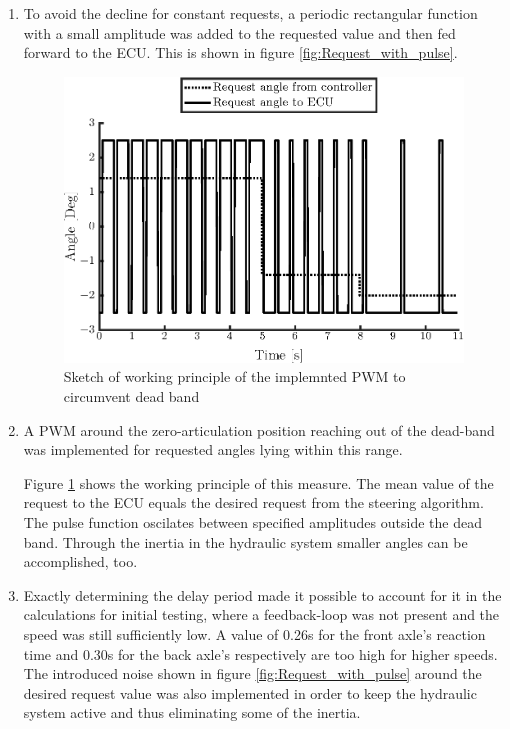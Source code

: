 \documentclass[root.tex]{subfiles}
\begin{document}
	\begin{enumerate}

		\item To avoid the decline for constant requests, a periodic rectangular function with a small amplitude was added to the requested value and then fed forward to the \gls{ECU}. This is shown in figure \ref{fig:Request_with_pulse}. 
		
		

	\begin{figure}[h!]
		\centering
		\includegraphics[width=1\linewidth]{Deadband}
		\caption[Sketch of working princiiple of the implemnted PWM to circumvent dead band]{Sketch of working principle of the implemnted PWM to circumvent dead band}
		\label{fig:Deadband}
	\end{figure}
	
		\item A \gls{PWM} around the zero-articulation position reaching out of the dead-band was implemented for requested angles lying within this range. 
		
		
		
		Figure \ref{fig:Deadband} shows the working principle of this measure. The mean value of the request to the \gls{ECU} equals the desired request from the steering algorithm. The pulse function oscilates between specified amplitudes outside the dead band. Through the inertia in the hydraulic system smaller angles can be accomplished, too.
				
		\item Exactly determining the delay period made it possible to account for it in the calculations for initial testing, where a feedback-loop was not present and the speed was still sufficiently low. A value of 0.26\unit{s} for the front axle's reaction time and 0.30\unit{s} for the back axle's respectively are too high for higher speeds.\\
		The introduced noise shown in figure \ref{fig:Request_with_pulse} around the desired request value was also implemented in order to keep the hydraulic system active and thus eliminating some of the inertia. 
	\end{enumerate}
	
	
	
	
	
	
\end{document}
